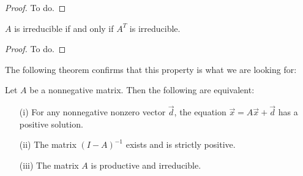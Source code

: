 \begin{proof}
	To do. 
\end{proof}
\begin{fact}
	$A$ is irreducible if and only if $A^T$ is irreducible.
\end{fact}
\begin{proof}
	To do.
\end{proof}
The following theorem confirms that this property is what we are looking for:
\begin{theorem}
	Let $A$ be a nonnegative matrix. Then the following are equivalent:
	\begin{itemize}	
		\item[(i)] For any nonnegative nonzero vector $\vec{d}$, the equation $\vec{x} = A\vec{x}+\vec{d}$ has a positive solution.
		\item[(ii)] The matrix $(I-A)^{-1}$ exists and is strictly positive. 
		\item[(iii)] The matrix $A$ is productive and irreducible. 
	\end{itemize}
\end{theorem}
